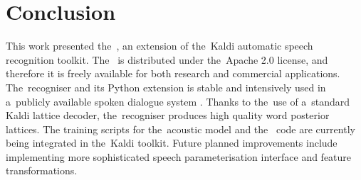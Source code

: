 \chapter{Conclusion}
\label{cha:conclusion}


This work presented the~, an extension of the~Kaldi automatic speech recognition toolkit.
The~ is distributed under the~Apache 2.0 license, and therefore it is freely available for both research and commercial applications.
The~recogniser and its Python extension is stable and intensively used in a~publicly available spoken dialogue system \cite{ptics2014url}.
Thanks to the~use of a~standard Kaldi lattice decoder, the~recogniser produces high quality word posterior lattices.
The training scripts for the~acoustic model and the~ code are currently being integrated in the~Kaldi toolkit.
Future planned improvements include implementing more sophisticated speech parameterisation interface and feature transformations.

% 
% 
% 


